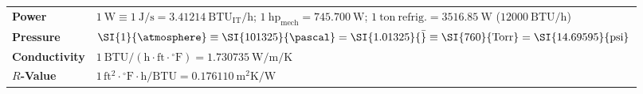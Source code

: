 \begin{quicksheet*}
\begin{twocol}[0.49]
\begin{formulacard}
\begin{tabularx}{\linewidth}{@{}l X@{}}
\textbf{Power} & $\SI{1}{\watt} \equiv \SI{1}{\joule\per\second} = \SI{3.41214}{\mathrm{BTU_{IT}/h}}$; $\SI{1}{\mathrm{hp_{mech}}} = \SI{745.700}{\watt}$; $\SI{1}{\mathrm{ton\ refrig.}} = \SI{3516.85}{\watt}$ ($\SI{12000}{\mathrm{BTU/h}}$)\\
\textbf{Pressure} & $\SI{1}{\atmosphere} \equiv \SI{101325}{\pascal} = \SI{1.01325}{\bar} \equiv \SI{760}{\mathrm{Torr}} = \SI{14.69595}{\mathrm{psi}}$\\
\textbf{Conductivity} & $\SI{1}{\mathrm{BTU/(h\cdot ft\cdot {^\circ F})}} = \SI{1.730735}{\watt\per\meter\per\kelvin}$\\
\textbf{$R$-Value} & $1\,\mathrm{ft^2\cdot {^\circ F}\cdot h/BTU} = \SI{0.176110}{\square\meter\kelvin\per\watt}$\\\bottomrule
\end{tabularx}
\end{formulacard}
\end{twocol}


\end{quicksheet*}
